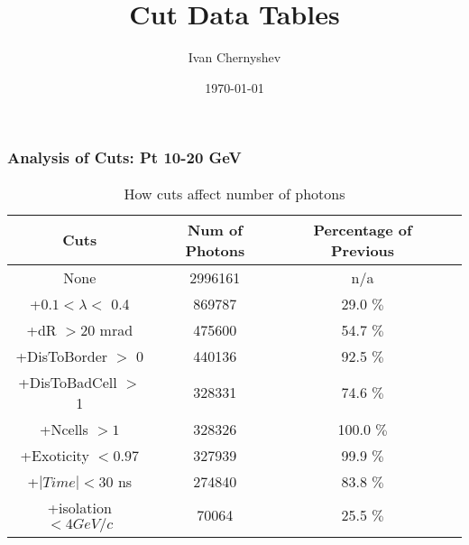 \documentclass{beamer}
\title{Cut Data Tables}
\author{Ivan Chernyshev}
\date{\today}
\begin{document}
 

\frame 
{ 
\frametitle{Analysis of Cuts: Pt 10-20 GeV} 
\begin{table} 
\caption{How cuts affect number of photons} 
\centering 
\begin{tabular}{c c c c} 
\hline\hline 
Cuts & Num of Photons & Percentage of Previous\\ [0.5ex] 
\hline
None & 2996161 & n/a\\
+$0.1 < \lambda <$ 0.4 & 869787 & 29.0 $\%$ \\
+dR $> 20$ mrad & 475600 & 54.7 $\%$ \\
+DisToBorder $>$ 0 & 440136 & 92.5 $\%$ \\
+DisToBadCell $>$ 1 & 328331 & 74.6 $\%$ \\
+Ncells $> 1$ & 328326 & 100.0 $\%$ \\
+Exoticity $< 0.97$ & 327939 & 99.9 $\%$ \\
+$|Time| < 30$ ns & 274840 & 83.8 $\%$ \\
+isolation $< 4 GeV/c$ & 70064 & 25.5 $\%$ \\
[1ex] 
\hline 
\end{tabular} 
\label{table:nonlin} 
\end{table} 
} 
\end{document}
